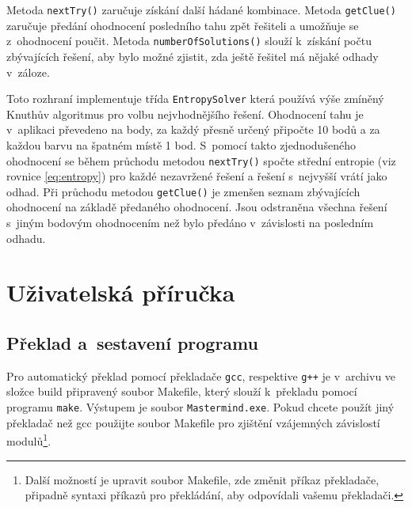 \documentclass[12pt, a4paper]{article}
\begin{document}
Metoda \texttt{nextTry()} zaručuje získání další hádané kombinace. Metoda \texttt{getClue()} zaručuje předání ohodnocení posledního tahu zpět řešiteli a umožňuje se z~ohodnocení poučit. Metoda \texttt{numberOfSolutions()} slouží k~získání počtu zbývajících řešení, aby bylo možné zjistit, zda ještě řešitel má nějaké odhady v~záloze.

Toto rozhraní implementuje třída \texttt{EntropySolver} která používá výše zmíněný Knuthův algoritmus pro volbu nejvhodnějšího řešení. Ohodnocení tahu je v~aplikaci převedeno na body, za každý přesně určený připočte 10 bodů a za každou barvu na špatném místě 1 bod. S~pomocí takto zjednodušeného ohodnocení se během průchodu metodou \texttt{nextTry()} spočte střední entropie (viz rovnice \ref{eq:entropy}) pro každé nezavržené řešení a řešení s~nejvyšší vrátí jako odhad. Při průchodu metodou \texttt{getClue()} je zmenšen seznam zbývajících ohodnocení na základě předaného ohodnocení. Jsou odstraněna všechna řešení s~jiným bodovým ohodnocením než bylo předáno v~závislosti na posledním odhadu.

\section{Uživatelská příručka} %

\subsection{Překlad a~sestavení programu}

Pro automatický překlad pomocí překladače \texttt{gcc}, respektive \texttt{g++} je v~archivu ve složce build připravený soubor Makefile, který slouží k~překladu pomocí programu \texttt{make}. Výstupem je soubor \texttt{Mastermind.exe}. Pokud chcete použít jiný překladač než gcc použijte soubor Makefile pro zjištění vzájemných závislostí modulů\footnote{Další možností je upravit soubor Makefile, zde změnit příkaz překladače, připadně syntaxi příkazů pro překládání, aby odpovídali vašemu překladači.}.

\end{document}
